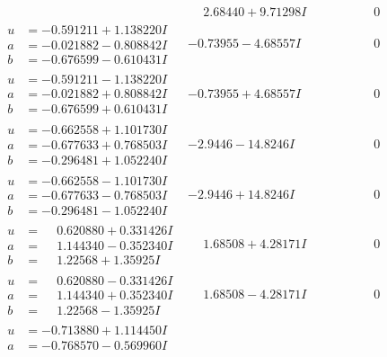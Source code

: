 \documentclass[1p]{elsarticle_modified}
\theoremstyle{definition}
\begin{document}
$$\begin{array}{c|c|c}
 & \phantom{-}2.68440 + 9.71298 I & \phantom{-0.000000 } 0 \\ \hline\begin{aligned}
u &= -0.591211 + 1.138220 I \\
a &= -0.021882 - 0.808842 I \\
b &= -0.676599 - 0.610431 I\end{aligned}
 & -0.73955 - 4.68557 I & \phantom{-0.000000 } 0 \\ \hline\begin{aligned}
u &= -0.591211 - 1.138220 I \\
a &= -0.021882 + 0.808842 I \\
b &= -0.676599 + 0.610431 I\end{aligned}
 & -0.73955 + 4.68557 I & \phantom{-0.000000 } 0 \\ \hline\begin{aligned}
u &= -0.662558 + 1.101730 I \\
a &= -0.677633 + 0.768503 I \\
b &= -0.296481 + 1.052240 I\end{aligned}
 & -2.9446 - 14.8246 I & \phantom{-0.000000 } 0 \\ \hline\begin{aligned}
u &= -0.662558 - 1.101730 I \\
a &= -0.677633 - 0.768503 I \\
b &= -0.296481 - 1.052240 I\end{aligned}
 & -2.9446 + 14.8246 I & \phantom{-0.000000 } 0 \\ \hline\begin{aligned}
u &= \phantom{-}0.620880 + 0.331426 I \\
a &= \phantom{-}1.144340 - 0.352340 I \\
b &= \phantom{-}1.22568 + 1.35925 I\end{aligned}
 & \phantom{-}1.68508 + 4.28171 I & \phantom{-0.000000 } 0 \\ \hline\begin{aligned}
u &= \phantom{-}0.620880 - 0.331426 I \\
a &= \phantom{-}1.144340 + 0.352340 I \\
b &= \phantom{-}1.22568 - 1.35925 I\end{aligned}
 & \phantom{-}1.68508 - 4.28171 I & \phantom{-0.000000 } 0 \\ \hline\begin{aligned}
u &= -0.713880 + 1.114450 I \\
a &= -0.768570 - 0.569960 I \\

\end{aligned}
\end{array}$$
\end{document}
